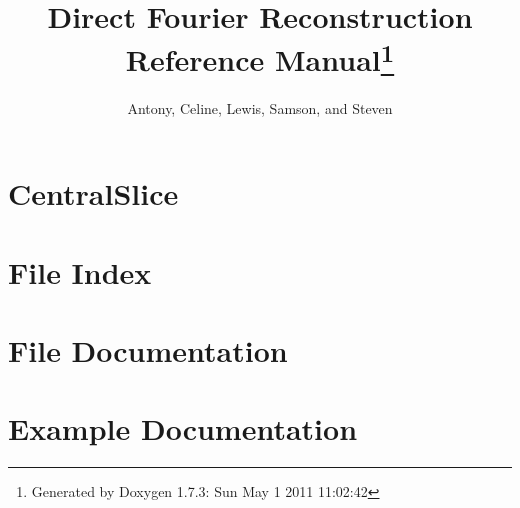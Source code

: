 \documentclass[a4paper]{book}
\begin{document}
\hypersetup{pageanchor=false}
\title{Direct Fourier Reconstruction\\
Reference Manual\footnote{Generated by Doxygen 1.7.3: Sun May 1 2011 11:02:42}}
\author{Antony, Celine, Lewis, Samson, and Steven}
\date{}
\maketitle
\clearemptydoublepage
{}
\tableofcontents
\clearemptydoublepage
{}
\hypersetup{pageanchor=true}
\chapter{CentralSlice}
\label{index}\hypertarget{index}{}
\chapter{File Index}

\chapter{File Documentation}






















\chapter{Example Documentation}

\printindex
\end{document}
